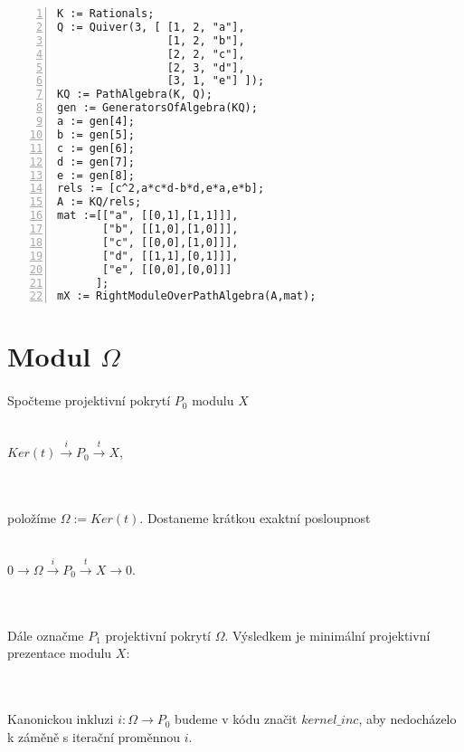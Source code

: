         \begin{Verbatim}[frame=single,numbers=left]
K := Rationals;
Q := Quiver(3, [ [1, 2, "a"], 
                 [1, 2, "b"], 
                 [2, 2, "c"], 
                 [2, 3, "d"], 
                 [3, 1, "e"] ]);
KQ := PathAlgebra(K, Q);
gen := GeneratorsOfAlgebra(KQ);
a := gen[4];
b := gen[5];
c := gen[6];
d := gen[7];
e := gen[8];
rels := [c^2,a*c*d-b*d,e*a,e*b];
A := KQ/rels;
mat :=[["a", [[0,1],[1,1]]],
       ["b", [[1,0],[1,0]]],
       ["c", [[0,0],[1,0]]],
       ["d", [[1,1],[0,1]]],
       ["e", [[0,0],[0,0]]]
      ];
mX := RightModuleOverPathAlgebra(A,mat);
        \end{Verbatim}
    
  \section{Modul $\Omega$}
  
      
      \paragraph{ } Spočteme projektivní pokrytí $P_0$ modulu $X$ \\\\
      \centerline{$Ker(t)\xrightarrow{i} P_{0}\xrightarrow{t}X$,} \\\\
      položíme $\Omega:=Ker(t)$. Dostaneme krátkou exaktní posloupnost \\\\
      \centerline{$0\rightarrow\Omega\xrightarrow{i} P_{0}\xrightarrow{t}X\rightarrow0$.}  \\\\
      Dále označme $P_1$ projektivní pokrytí $\Omega$. Výsledkem je minimální 
      projektivní prezentace modulu $X$: \\
      \centerline{  }      \\\\      
      Kanonickou inkluzi $i:\Omega\rightarrow P_0$ budeme v kódu značit 
      $kernel\_inc$, aby nedocházelo k záměně s  iterační proměnnou $i$.

